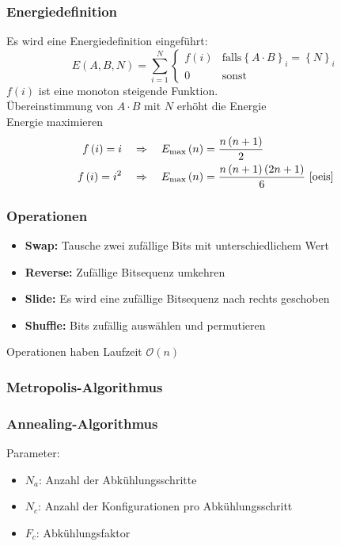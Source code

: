 \begin{frame}
  \frametitle{Energiedefinition}
  Es wird eine Energiedefinition eingeführt:
  \begin{equation*}
    E\left(A,B,N\right)=\sum\limits_{i=1}^N\begin{cases}f\left(i\right) & \mathrm{falls} {\left\{A\cdot B\right\}}_i={\left\{N\right\}}_i \\ 0 & \mathrm{sonst}\end{cases}
  \end{equation*}
  \pause{}
  $f\left(i\right)$ ist eine monoton steigende Funktion. \\
  \Rightarrow{} Übereinstimmung von $A\cdot B$ mit $N$ erhöht die Energie \\
  \Rightarrow{} Energie maximieren
  \pause{}
  \begin{align*}
    f\left(i\right)=i \quad&\Rightarrow\quad E_\mathrm{\max}\left(n\right)=\frac{n\left(n+1\right)}{2} \\
    f\left(i\right)=i^2 \quad&\Rightarrow\quad E_\mathrm{\max}\left(n\right)=\frac{n\left(n+1\right)\left(2n+1\right)}{6}\text{~\cite{oeis}}
  \end{align*}
\end{frame}

\begin{frame}
  \frametitle{Operationen}
  \begin{itemize}
    \setlength{\itemsep}{5pt}
    \item\textbf{Swap:} Tausche zwei zufällige Bits mit unterschiedlichem Wert
    \item\textbf{Reverse:} Zufällige Bitsequenz umkehren
    \item\textbf{Slide:} Es wird eine zufällige Bitsequenz nach rechts geschoben
    \item\textbf{Shuffle:} Bits zufällig auswählen und permutieren
  \end{itemize}
  Operationen haben Laufzeit $\mathcal{O}\left(n\right)$
\end{frame}

\begin{frame}
  \frametitle{Metropolis-Algorithmus}
  
\end{frame}

\begin{frame}
  \frametitle{Annealing-Algorithmus}
  Parameter:
  \begin{itemize}
    \item $N_a$: Anzahl der Abkühlungsschritte
    \item $N_c$: Anzahl der Konfigurationen pro Abkühlungsschritt
    \item $F_c$: Abkühlungsfaktor
  \end{itemize}
  \vspace{0.5cm}
  
\end{frame}

